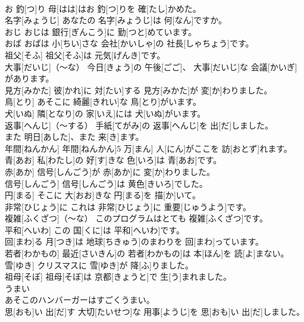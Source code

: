 \documentclass[8pt]{extreport}
\begin{document}
\begin{CJK}{UTF8}{min}
\\	お 釣[つ]り	母[はは]はお 釣[つ]りを 確[たし]かめた。		
\\	名字[みょうじ]	あなたの 名字[みょうじ]は 何[なん]ですか。		
\\	おじ	おじは 銀行[ぎんこう]に 勤[つと]めています。		
\\	おば	おばは 小[ちい]さな 会社[かいしゃ]の 社長[しゃちょう]です。		
\\	祖父[そふ]	祖父[そふ]は 元気[げんき]です。		
\\	大事[だいじ]（～な）	今日[きょう]の 午後[ごご]、 大事[だいじ]な 会議[かいぎ]があります。		
\\	見方[みかた]	彼[かれ]に 対[たい]する 見方[みかた]が 変[か]わりました。		
\\	鳥[とり]	あそこに 綺麗[きれい]な 鳥[とり]がいます。		
\\	犬[いぬ]	隣[となり]の 家[いえ]には 犬[いぬ]がいます。		
\\	返事[へんじ]（～する）	手紙[てがみ]の 返事[へんじ]を 出[だ]しました。		
\\	また	明日[あした]、また 来[き]ます。		
\\	年間[ねんかん]	年間[ねんかん]5 万[まん] 人[にん]がここを 訪[おとず]れます。		
\\	青[あお]	私[わたし]の 好[す]きな 色[いろ]は 青[あお]です。		
\\	赤[あか]	信号[しんごう]が 赤[あか]に 変[か]わりました。		
\\	信号[しんごう]	信号[しんごう]は 黄色[きいろ]でした。		
\\	円[まる]	そこに 大[おお]きな 円[まる]を 描[か]いて。		
\\	非常[ひじょう]に	これは 非常[ひじょう]に 重要[じゅうよう]です。		
\\	複雑[ふくざつ]（～な）	このプログラムはとても 複雑[ふくざつ]です。		
\\	平和[へいわ]	この 国[くに]は 平和[へいわ]です。		
\\	回[まわ]る	月[つき]は 地球[ちきゅう]のまわりを 回[まわ]っています。		
\\	若者[わかもの]	最近[さいきん]の 若者[わかもの]は 本[ほん]を 読[よ]まない。		
\\	雪[ゆき]	クリスマスに 雪[ゆき]が 降[ふ]りました。		
\\	祖母[そぼ]	祖母[そぼ]は 京都[きょうと]で 生[う]まれました。		
\\	うまい
\\	あそこのハンバーガーはすごくうまい。		
\\	思[おも]い 出[だ]す	大切[たいせつ]な 用事[ようじ]を 思[おも]い 出[だ]しました。		

\end{CJK}
\end{document}
